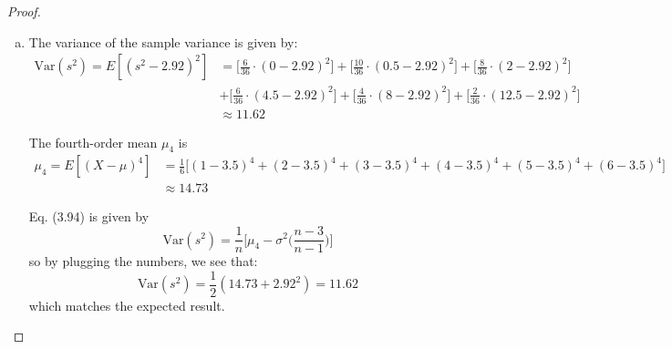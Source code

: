 \begin{proof}
\begin{enumerate}[(a)]
    \vspace{1em}

    \item The variance of the sample variance is given by:
        \begin{align*}
            \text{Var}(s^2) = E[(s^2 - 2.92)^2]
               &= \bigg[\frac{6}{36} \cdot (0 - 2.92)^2\bigg] 
                + \bigg[\frac{10}{36} \cdot (0.5 - 2.92)^2\bigg]
                + \bigg[\frac{8}{36} \cdot (2 - 2.92)^2\bigg] \\ 
               &+ \bigg[\frac{6}{36} \cdot (4.5 - 2.92)^2\bigg]
                + \bigg[\frac{4}{36} \cdot (8 - 2.92)^2\bigg]
                + \bigg[\frac{2}{36} \cdot (12.5 - 2.92)^2\bigg] \\
               &\approx 11.62
        \end{align*}

        The fourth-order mean $\mu_4$ is
        \begin{align*}
            \mu_4 = E[(X - \mu)^4] 
            &= \frac{1}{6}\big[(1 - 3.5)^4 + (2 - 3.5)^4 + (3 - 3.5)^4 
                + (4 - 3.5)^4 + (5 - 3.5)^4 + (6 - 3.5)^4] \\
            &\approx 14.73
        \end{align*}

        Eq. (3.94) is given by
        \begin{equation*}\tag{3.94}
            \text{Var}(s^2) = \frac{1}{n}\bigg[\mu_4 - \sigma^2\bigg(\frac{n-3}{n-1}\bigg)\bigg]
        \end{equation*}
        so by plugging the numbers, we see that: 
        \[
            \text{Var}(s^2) = \frac{1}{2}(14.73 + {2.92}^2) = 11.62
        \] 
        which matches the expected result.
    \end{enumerate}
\end{proof}


